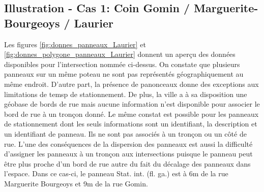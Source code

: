 \subsection{Illustration - Cas 1: Coin Gomin / Marguerite-Bourgeoys / Laurier}
Les figures \ref{fig:donnes_panneaux_Laurier} et \ref{fig:donnes_polygone_panneaux_Laurier} donnent un aperçu des données disponibles pour l'intersection nommée ci-dessus. On constate que plusieurs panneaux sur un même poteau ne sont pas représentés géographiquement au même endroit. D'autre part, la présence de panonceaux donne des exceptions aux limitations de temsp de stationnement. De plus, la ville a à sa disposition une géobase de bords de rue mais aucune information n'est disponible pour associer le bord de rue à un tronçon donné. Le même constat est possible pour les panneaux de stationnement dont les seuls informations sont un identifiant, la description et un identifiant de panneau. Ils ne sont pas associés à un tronçon ou un côté de rue. L'une des conséquences de la dispersion des panneaux est aussi la difficulté d'assigner les panneaux à un tronçon aux intersections puisque le panneau peut être plus proche d'un bord de rue autre du fait du décalage des panneaux dans l'espace. Dans ce cas-ci, le panneau Stat. int. (fl. ga.) est à 6m de la rue Marguerite Bourgeoys et 9m de la rue Gomin.
